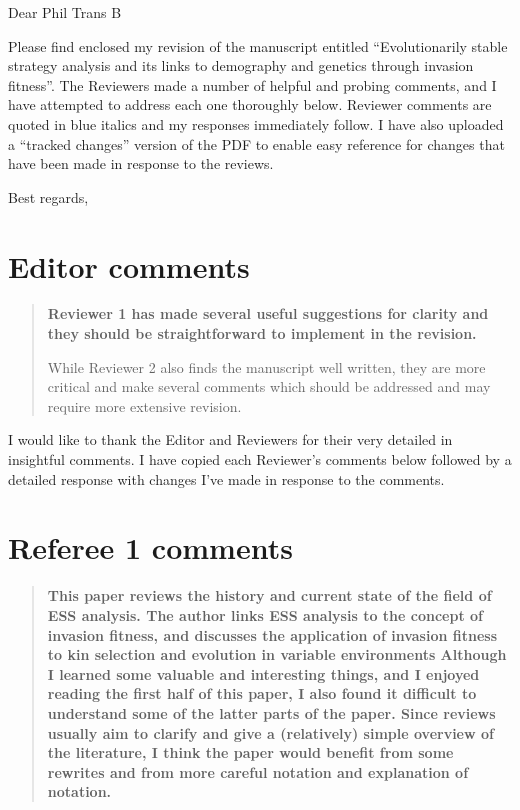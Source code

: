 \documentclass[10pt,parskip=full,foldmarks=off,addrfield=off,backaddress=false,refline=dateleft,letterpaper]{scrlttr2}
\newenvironment{reviewerquote}{\begin{quote}\color{DarkBlue}\bfseries}{\end{quote}}
\begin{document}
\begin{letter}

  \opening{Dear Phil Trans B}

  Please find enclosed my revision of the manuscript entitled ``Evolutionarily stable strategy analysis and its links to demography and genetics through invasion fitness''. The Reviewers made a number of helpful and probing comments, and I have attempted to address each one thoroughly below. Reviewer comments are quoted in blue italics and my responses immediately follow. I have also uploaded a ``tracked changes'' version of the PDF to enable easy reference for changes that have been made in response to the reviews.

  \closing{Best regards,}

\section{Editor comments}

\begin{reviewerquote}
  Reviewer 1 has made several useful suggestions for clarity and they should be straightforward to implement in the revision.

  While Reviewer 2 also finds the manuscript well written, they are more critical and make several comments which should be addressed and may require more extensive revision.
\end{reviewerquote}

I would like to thank the Editor and Reviewers for their very detailed in insightful comments. I have copied each Reviewer's comments below followed by a detailed response with changes I've made in response to the comments.

\section{Referee 1 comments}

\begin{reviewerquote}
  This paper reviews the history and current state of the field of ESS analysis. The author links ESS analysis to the concept of invasion fitness, and discusses the application of invasion fitness to kin selection and evolution in variable environments Although I learned some valuable and interesting things, and I enjoyed reading the first half of this paper, I also found it difficult to understand some of the latter parts of the paper. Since reviews usually aim to clarify and give a (relatively) simple overview of the literature, I think the paper would benefit from some rewrites and from more careful notation and explanation of notation.
\end{reviewerquote}


\end{letter}
\end{document}
